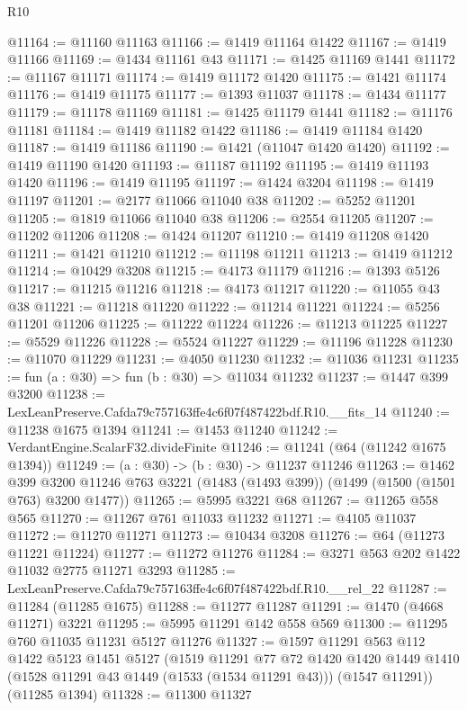 \begin{lexlean}{R10}
\begin{coremodule}
@11164 := @11160 @11163
@11166 := @1419 @11164 @1422
@11167 := @1419 @11166
@11169 := @1434 @11161 @43
@11171 := @1425 @11169 @1441
@11172 := @11167 @11171
@11174 := @1419 @11172 @1420
@11175 := @1421 @11174
@11176 := @1419 @11175
@11177 := @1393 @11037
@11178 := @1434 @11177
@11179 := @11178 @11169
@11181 := @1425 @11179 @1441
@11182 := @11176 @11181
@11184 := @1419 @11182 @1422
@11186 := @1419 @11184 @1420
@11187 := @1419 @11186
@11190 := @1421 (@11047 @1420 @1420)
@11192 := @1419 @11190 @1420
@11193 := @11187 @11192
@11195 := @1419 @11193 @1420
@11196 := @1419 @11195
@11197 := @1424 @3204
@11198 := @1419 @11197
@11201 := @2177 @11066 @11040 @38
@11202 := @5252 @11201
@11205 := @1819 @11066 @11040 @38
@11206 := @2554 @11205
@11207 := @11202 @11206
@11208 := @1424 @11207
@11210 := @1419 @11208 @1420
@11211 := @1421 @11210
@11212 := @11198 @11211
@11213 := @1419 @11212
@11214 := @10429 @3208
@11215 := @4173 @11179
@11216 := @1393 @5126
@11217 := @11215 @11216
@11218 := @4173 @11217
@11220 := @11055 @43 @38
@11221 := @11218 @11220
@11222 := @11214 @11221
@11224 := @5256 @11201 @11206
@11225 := @11222 @11224
@11226 := @11213 @11225
@11227 := @5529 @11226
@11228 := @5524 @11227
@11229 := @11196 @11228
@11230 := @11070 @11229
@11231 := @4050 @11230
@11232 := @11036 @11231
@11235 := fun (a : @30) => fun (b : @30) => @11034 @11232
@11237 := @1447 @399 @3200
@11238 := LexLeanPreserve.Cafda79c757163ffe4c6f07f487422bdf.R10.__fits_14
@11240 := @11238 @1675 @1394
@11241 := @1453 @11240
@11242 := VerdantEngine.ScalarF32.divideFinite
@11246 := @11241 (@64 (@11242 @1675 @1394))
@11249 := (a : @30) -> (b : @30) -> @11237 @11246
@11263 := @1462
    @399
    @3200
    @11246
    @763
    @3221
    (@1483 (@1493 @399))
    (@1499 (@1500 (@1501 @763) @3200 @1477))
@11265 := @5995 @3221 @68
@11267 := @11265 @558 @565
@11270 := @11267 @761 @11033 @11232
@11271 := @4105 @11037
@11272 := @11270 @11271
@11273 := @10434 @3208
@11276 := @64 (@11273 @11221 @11224)
@11277 := @11272 @11276
@11284 := @3271 @563 @202 @1422 @11032 @2775 @11271 @3293
@11285 := LexLeanPreserve.Cafda79c757163ffe4c6f07f487422bdf.R10.__rel_22
@11287 := @11284 (@11285 @1675)
@11288 := @11277 @11287
@11291 := @1470 (@4668 @11271) @3221
@11295 := @5995 @11291 @142 @558 @569
@11300 := @11295 @760 @11035 @11231 @5127 @11276
@11327 := @1597
    @11291
    @563
    @112
    @1422
    @5123
    @1451
    @5127
    (@1519
      @11291
      @77
      @72
      @1420
      @1420
      @1449
      @1410
      (@1528 @11291 @43 @1449 (@1533 (@1534 @11291 @43)))
      (@1547 @11291))
    (@11285 @1394)
@11328 := @11300 @11327

\end{coremodule}
\end{lexlean}
